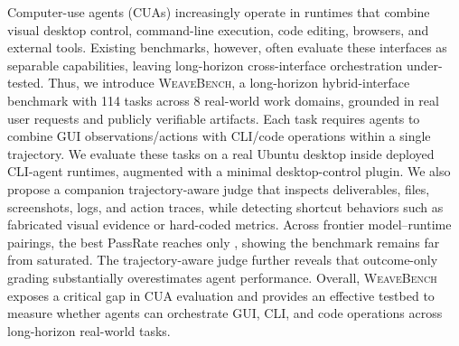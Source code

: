 Computer-use agents (CUAs) increasingly operate in runtimes that combine visual desktop control, command-line execution, code editing, browsers, and external tools. Existing benchmarks, however, often evaluate these interfaces as separable capabilities, leaving long-horizon cross-interface orchestration under-tested.
Thus, we introduce \textsc{WeaveBench}, a long-horizon hybrid-interface benchmark with 114 tasks across 8 real-world work domains, grounded in real user requests and publicly verifiable artifacts.
Each task requires agents to combine GUI observations/actions with CLI/code operations within a single trajectory.
We evaluate these tasks on a real Ubuntu desktop inside deployed CLI-agent runtimes, augmented with a minimal desktop-control plugin.
We also propose a companion trajectory-aware judge that inspects deliverables, files, screenshots, logs, and action traces, while detecting shortcut behaviors such as fabricated visual evidence or hard-coded metrics.
Across frontier model--runtime pairings, the best PassRate reaches only , showing the benchmark remains far from saturated.
The trajectory-aware judge further reveals that outcome-only grading substantially overestimates agent performance.
Overall, \textsc{WeaveBench} exposes a critical gap in CUA evaluation and provides an effective testbed to measure whether agents can orchestrate GUI, CLI, and code operations across long-horizon real-world tasks.
